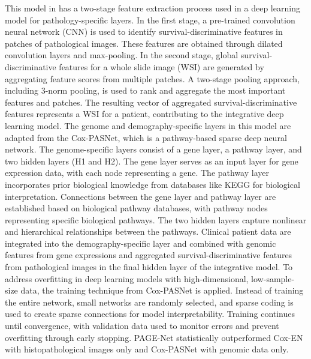\documentclass[journal,twoside,web]{ieeecolor}
\begin{document}
This model in \cite{hao2019page} has a two-stage feature extraction process used in a deep learning model for pathology-specific layers. 
In the first stage, a pre-trained convolution neural network (CNN) is used to identify survival-discriminative features in patches of pathological images. 
These features are obtained through dilated convolution layers and max-pooling. 
In the second stage, global survival-discriminative features for a whole slide image (WSI) are generated by aggregating feature scores from multiple patches. 
A two-stage pooling approach, including 3-norm pooling, is used to rank and aggregate the most important features and patches. 
The resulting vector of aggregated survival-discriminative features represents a WSI for a patient, contributing to the integrative deep learning model.
The genome and demography-specific layers in this model are adapted from the Cox-PASNet\cite{hao2018cox}, which is a pathway-based sparse deep neural network. 
The genome-specific layers consist of a gene layer, a pathway layer, and two hidden layers (H1 and H2). 
The gene layer serves as an input layer for gene expression data, with each node representing a gene. 
The pathway layer incorporates prior biological knowledge from databases like KEGG for biological interpretation. 
Connections between the gene layer and pathway layer are established based on biological pathway databases, with pathway nodes representing specific biological pathways. 
The two hidden layers capture nonlinear and hierarchical relationships between the pathways.
Clinical patient data are integrated into the demography-specific layer and combined with genomic features from gene expressions and aggregated survival-discriminative features from pathological images in the final hidden layer of the integrative model. 
To address overfitting in deep learning models with high-dimensional, low-sample-size data, the training technique from Cox-PASNet is applied. 
Instead of training the entire network, small networks are randomly selected, and sparse coding is used to create sparse connections for model interpretability. 
Training continues until convergence, with validation data used to monitor errors and prevent overfitting through early stopping.
PAGE-Net statistically outperformed Cox-EN with histopathological images only and Cox-PASNet with genomic data only. 
\end{document}
